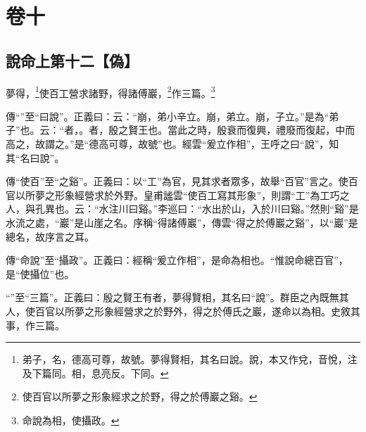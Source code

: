 

\chapter{卷十}


\section{說命上第十二【偽】}


夢得，\footnote{弟子，名，德高可尊，故號。夢得賢相，其名曰說。說，本又作兌，音悅，注及下篇同。相，息亮反。下同。}使百工營求諸野，得諸傅巖，\footnote{使百官以所夢之形象經求之於野，得之於傅巖之谿。}作三篇。\footnote{命說為相，使攝政。}


{\noindent\zhuan{}\fzbyks 傳“”至“曰說”。正義曰：云：“崩，弟小辛立。崩，弟立。崩，子立。”是為“弟子”也。云：“者，。者，殷之賢王也。當此之時，殷衰而復興，禮廢而復起，中而高之，故謂之。”是“德高可尊，故號”也。經雲“爰立作相”，王呼之曰“說”，知其“名曰說”。 \par}

{\noindent\zhuan{}\fzbyks 傳“使百”至“之谿”。正義曰：以“工”為官，見其求者眾多，故舉“百官”言之。使百官以所夢之形象經營求於外野。皇甫謐雲“使百工寫其形象”，則謂“工”為工巧之人，與孔異也。云：“水注川曰谿。”李巡曰：“水出於山，入於川曰谿。”然則“谿”是水流之處，“巖”是山崖之名。序稱“得諸傅巖”，傳雲“得之於傅巖之谿”，以“巖”是總名，故序言之耳。 \par}

{\noindent\zhuan{}\fzbyks 傳“命說”至“攝政”。正義曰：經稱“爰立作相”，是命為相也。“惟說命總百官”，是“使攝位”也。 \par}

{\noindent\shu{}\fzkt “”至“三篇”。正義曰：殷之賢王有者，夢得賢相，其名曰“說”。群臣之內既無其人，使百官以所夢之形象經營求之於野外，得之於傅氏之巖，遂命以為相。史敘其事，作三篇。 \par}

